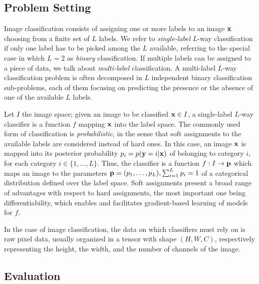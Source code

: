 \subsection{Problem Setting}
\label{subsec:back:classification}
Image classification consists of assigning one or more labels to an image $\mathbf{x}$ choosing from a finite set of $L$ labels.
We refer to \emph{single-label} $L$-way classification if only one label has to be picked among the $L$ available, referring to the special case in which $L=2$ as \emph{binary} classification.
If multiple labels can be assigned to a piece of data, we talk about \emph{multi-label} classification.
A multi-label $L$-way classification problem is often decomposed in $L$ independent binary classification sub-problems, each of them focusing on predicting the presence or the absence of one of the available $L$ labels.

Let $I$ the image space;
given an image to be classified $\mathbf{x} \in I$, a single-label $L$-way classifier is a function $f$ mapping $\mathbf{x}$ into the label space.
The commonly used form of classification is \emph{probabilistic}, in the sense that soft assignments to the available labels are considered instead of hard ones.
In this case, an image $\mathbf{x}$ is mapped into its posterior probability $p_i = p(\mathbf{y} = i | \mathbf{x})$ of belonging to category $i$, for each category $i \in \{1, \dots, L\}$.
Thus, the classifier is a function $f: I \to \mathbf{p}$ which maps an image to the parameters $\mathbf{p} = (p_1, \ldots, p_L), \sum_{i=1}^L p_i = 1$ of a categorical distribution defined over the label space.
Soft assignments present a broad range of advantages with respect to hard assignments, the most important one being differentiability, which enables and facilitates gradient-based learning of models for $f$.

In the case of image classification, the data on which classifiers must rely on is raw pixel data, usually organized in a tensor with shape $(H, W, C)$, respectively representing the height, the width, and the number of channels of the image.


\subsection{Evaluation}
\label{subsec:back:classif-eval}

